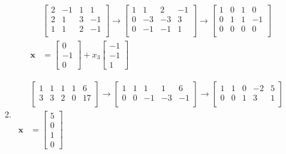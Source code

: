 \documentclass[letterpaper]{article}
\begin{document}
\begin{enumerate}
\begin{enumerate}
  \begin{align*}
    &
    \left[\begin{array}{rrr|r}
      2&-1&1& 1\\
      2& 1&3&-1\\
      1& 1&2&-1\\
    \end{array}\right]
    \to
    \left[\begin{array}{rrr|r}
      1& 1& 2&-1\\
      0&-3&-3& 3\\
      0&-1&-1& 1\\
    \end{array}\right]
    \to
    \left[\begin{array}{rrr|r}
      1& 0& 1& 0\\
      0& 1& 1&-1\\
      0& 0& 0& 0\\
    \end{array}\right]\\
    \mathbf{x}&=\left[\begin{array}{r}0\\-1\\0\end{array}\right]+x_3\left[\begin{array}{r}-1\\-1\\1\end{array}\right]
  \end{align*}
  \item
  \begin{align*}
    &
    \left[\begin{array}{rrrr|r}
      1&1&1&1&6\\
      3&3&2&0&17\\
    \end{array}\right]
    \to
    \left[\begin{array}{rrrr|r}
      1&1& 1& 1&6\\
      0&0&-1&-3&-1\\
    \end{array}\right]
    \to
    \left[\begin{array}{rrrr|r}
      1&1& 0&-2& 5\\
      0&0& 1& 3& 1\\
    \end{array}\right]\\
    \mathbf{x}&
    =\left[\begin{array}{r}5\\0\\1\\0\end{array}\right]

\end{align*}
\end{enumerate}
\end{enumerate}
\end{document}
